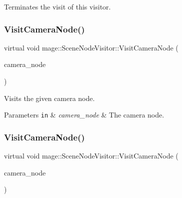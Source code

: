 Terminates the visit of this visitor. \hypertarget{classmage_1_1_scene_node_visitor_a01d831e494396ab678ce0c29b008a398}{}\label{classmage_1_1_scene_node_visitor_a01d831e494396ab678ce0c29b008a398} 
\subsubsection{\texorpdfstring{Visit\+Camera\+Node()}{VisitCameraNode()}\hspace{0.1cm}{\footnotesize\ttfamily [1/2]}}
{\footnotesize\ttfamily virtual void mage\+::\+Scene\+Node\+Visitor\+::\+Visit\+Camera\+Node (\begin{DoxyParamCaption}\item[{\hyperlink{classmage_1_1_camera_node}{Camera\+Node} \&}]{camera\+\_\+node }\end{DoxyParamCaption})\hspace{0.3cm}{\ttfamily [virtual]}}

Visits the given camera node.


\begin{DoxyParams}[1]{Parameters}
\mbox{\tt in}  & {\em camera\+\_\+node} & The camera node. \\
\hline
\end{DoxyParams}
\hypertarget{classmage_1_1_scene_node_visitor_a4a3bb0c3ad6253c919259efabbccfab9}{}\label{classmage_1_1_scene_node_visitor_a4a3bb0c3ad6253c919259efabbccfab9} 
\subsubsection{\texorpdfstring{Visit\+Camera\+Node()}{VisitCameraNode()}\hspace{0.1cm}{\footnotesize\ttfamily [2/2]}}
{\footnotesize\ttfamily virtual void mage\+::\+Scene\+Node\+Visitor\+::\+Visit\+Camera\+Node (\begin{DoxyParamCaption}\item[{const \hyperlink{classmage_1_1_camera_node}{Camera\+Node} \&}]{camera\+\_\+node }\end{DoxyParamCaption})\hspace{0.3cm}{\ttfamily [virtual]}}

